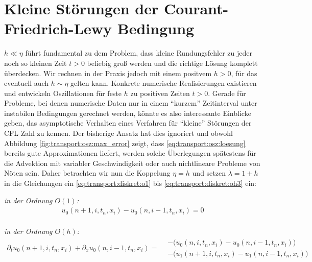 \section{Kleine Störungen der Courant-Friedrich-Lewy Bedingung}\label{sec:transport:kleineta}

$h \ll \eta$ führt fundamental zu dem Problem, dass kleine Rundungsfehler zu jeder noch so kleinen Zeit $t > 0$ beliebig groß werden und die richtige Lösung komplett überdecken.
Wir rechnen in der Praxis jedoch mit einem positvem $h > 0$, für das eventuell auch $h \sim \eta$ gelten kann.
Konkrete numerische Realisierungen existieren und entwickeln Oszillationen für feste $h$ zu positiven Zeiten $t > 0$.
Gerade für Probleme, bei denen numerische Daten nur in einem ``kurzem'' Zeitinterval unter instabilen Bedingungen gerechnet werden, könnte es also interessante Einblicke geben, das asymptotische Verhalten eines Verfahren für ``kleine'' Störungen der CFL Zahl zu kennen.
Der bisherige Ansatz hat dies ignoriert und obwohl Abbildung \ref{fig:transport:osz:max_error} zeigt, dass \eqref{eq:transport:osz:loesung} bereits gute Approximationen liefert, werden solche Überlegungen spätestens für die Advektion mit variabler Geschwindigkeit oder auch nichtlineare Probleme von Nöten sein.
Daher betrachten wir nun die Koppelung $\eta = h$ und setzen $\lambda = 1 + h$ in die Gleichungen ein \eqref{eq:transport:diskret:o1} bis \eqref{eq:transport:diskret:oh3} ein:

\vspace{0.4cm}
\noindent \emph{in der Ordnung $O(1)$:}
\begin{align}\label{eq:transport:kleineta:o1}
u_0(n+1, i, t_n, x_i) - u_0(n, i-1, t_n, x_i) = 0
\end{align}\\

\noindent \emph{in der Ordnung $O(h)$:}
\begin{align}\label{eq:transport:kleineta:oh}
\partial_t u_0(n+1, i, t_n, x_i) + \partial_x u_0(n, i-1, t_n, x_i) =
\begin{split}
&- \bigl( u_0(n, i, t_n, x_i) - u_0(n, i-1, t_n, x_i) \bigr)\\
&- \bigl( u_1(n+1, i, t_n, x_i) - u_1(n, i-1, t_n, x_i) \bigr)
\end{split}
\end{align}\\

